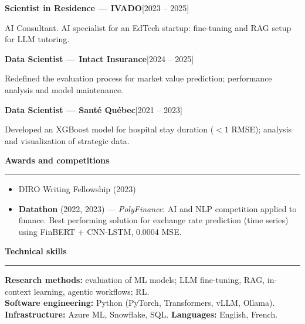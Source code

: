 \documentclass[10pt,a4paper]{article}
\newcommand{\cvsec}[1]{%
  \vspace{10pt}%
  {\noindent\large\bfseries #1\par}%
  \vspace{2pt}\hrule\vspace{7pt}%
}
\newcommand{\cventry}[2]{\noindent\textbf{#1}\hfill\textnormal{\small[#2]}\par}
\begin{document}
\cventry{Scientist in Residence --- IVADO}{2023 -- 2025}
AI Consultant. AI specialist for an EdTech startup: fine-tuning and RAG setup for LLM tutoring.

\vspace{2pt}
\cventry{Data Scientist --- Intact Insurance}{2024 -- 2025}
Redefined the evaluation process for market value prediction; performance analysis and model
maintenance.

\vspace{2pt}
\cventry{Data Scientist --- Sant\'e Qu\'ebec}{2021 -- 2023}
Developed an XGBoost model for hospital stay duration ($<1$ RMSE); analysis and visualization of
strategic data.

\cvsec{Awards and competitions}

\begin{itemize}
  \setlength{\itemsep}{2pt}
  \item DIRO Writing Fellowship (2023)
  \item \textbf{Datathon} (2022, 2023) --- \emph{PolyFinance}: AI and NLP competition applied to
        finance. Best performing solution for exchange rate prediction (time series) using
        FinBERT + CNN-LSTM, 0.0004 MSE.
\end{itemize}

\cvsec{Technical skills}

\noindent\textbf{Research methods:} evaluation of ML models; LLM fine-tuning, RAG, in-context
learning, agentic workflows; RL.\\
\textbf{Software engineering:} Python (PyTorch, Transformers, vLLM, Ollama).\\
\textbf{Infrastructure:} Azure ML, Snowflake, SQL. \quad \textbf{Languages:} English, French.
\end{document}
